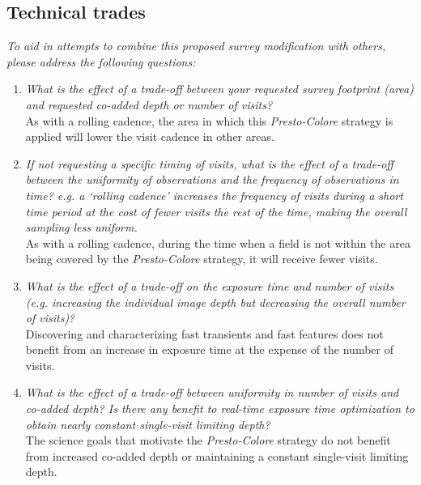 \documentclass[12pt, letterpaper]{article}
\begin{document}
\subsection{Technical trades}
{\footnotesize {\it To aid in attempts to combine this proposed survey modification with others, please address the following questions:}}
\begin{enumerate}
    \item {\footnotesize {\it What is the effect of a trade-off between your requested survey footprint (area) and requested co-added depth or number of visits?}} \\ As with a rolling cadence, the area in which this {\em Presto-Colore} strategy is applied will lower the visit cadence in other areas.
    \item {\footnotesize {\it If not requesting a specific timing of visits, what is the effect of a trade-off between the uniformity of observations and the frequency of observations in time? e.g. a `rolling cadence' increases the frequency of visits during a short time period at the cost of fewer visits the rest of the time, making the overall sampling less uniform.}} \\ As with a rolling cadence, during the time when a field is not within the area being covered by the {\em Presto-Colore} strategy, it will receive fewer visits.
    \item {\footnotesize {\it What is the effect of a trade-off on the exposure time and number of visits (e.g. increasing the individual image depth but decreasing the overall number of visits)?}} \\ Discovering and characterizing fast transients and fast features does not benefit from an increase in exposure time at the expense of the number of visits. 
    \item {\footnotesize {\it What is the effect of a trade-off between uniformity in number of visits and co-added depth? Is there any benefit to real-time exposure time optimization to obtain nearly constant single-visit limiting depth?}} \\ The science goals that motivate the {\em Presto-Colore} strategy do not benefit from increased co-added depth or maintaining a constant single-visit limiting depth.

\end{enumerate}
\end{document}
